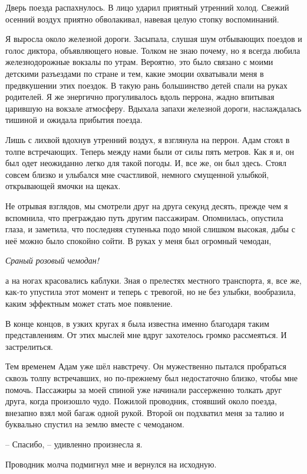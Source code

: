 \documentclass[
]{book}
\begin{document}
Дверь поезда распахнулось. В лицо ударил приятный утренний холод. Свежий осенний воздух приятно обволакивал, навевая целую стопку воспоминаний.

Я выросла около железной дороги. Засыпала, слушая шум отбывающих поездов и голос диктора, объявляющего новые. Толком не знаю почему, но я всегда любила железнодорожные вокзалы по утрам. Вероятно, это было связано с моими детскими разъездами по стране и тем, какие эмоции охватывали меня в предвкушении этих поездок. В такую рань большинство детей спали на руках родителей. Я же энергично прогуливалось вдоль перрона, жадно впитывая царившую на вокзале атмосферу. Вдыхала запахи железной дороги, наслаждалась тишиной и ожидала прибытия поезда.

Лишь с лихвой вдохнув утренний воздух, я взглянула на перрон. Адам стоял в толпе встречающих. Теперь между нами были от силы пять метров. Как я и, он был одет неожиданно легко для такой погоды. И, все же, он был здесь. Стоял совсем близко и улыбался мне счастливой, немного смущенной улыбкой, открывающей ямочки на щеках.

Не отрывая взглядов, мы смотрели друг на друга секунд десять, прежде чем я вспомнила, что преграждаю путь другим пассажирам. Опомнилась, опустила глаза, и заметила, что последняя ступенька подо мной слишком высокая, дабы с неё можно было спокойно сойти. В руках у меня был огромный чемодан,

\emph{Сраный розовый чемодан!}

а на ногах красовались каблуки. Зная о прелестях местного транспорта, я, все же, как-то упустила этот момент и теперь с тревогой, но не без улыбки, вообразила, каким эффектным может стать мое появление.

В конце концов, в узких кругах я была известна именно благодаря таким представлениям. От этих мыслей мне вдруг захотелось громко рассмеяться. И застрелиться.

Тем временем Адам уже шёл навстречу. Он мужественно пытался пробраться сквозь толпу встречавших, но по-прежнему был недостаточно близко, чтобы мне помочь. Пассажиры за моей спиной уже начинали рассерженно толкать друг друга, когда произошло чудо. Пожилой проводник, стоявший около поезда, внезапно взял мой багаж одной рукой. Второй он подхватил меня за талию и буквально спустил на землю вместе с чемоданом.

-- Спасибо, -- удивленно произнесла я.

Проводник молча подмигнул мне и вернулся на исходную.
\end{document}

